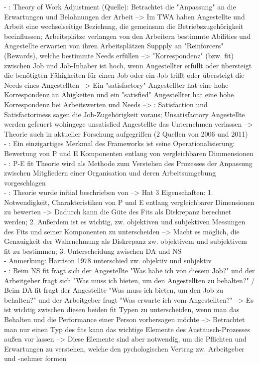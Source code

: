 - \cite[S. 3]{su:2015}: Theory of Work Adjustment (Quelle): Betrachtet die "Anpassung" an die Erwartungen und Belohnungen der Arbeit --> Im TWA haben Angestellte und Arbeit eine wechselseitige Beziehung, die gemeinsam die Betriebszugehörigkeit beeinflussen; Arbeitsplätze verlangen von den Arbeitern bestimmte Abilities und Angestellte erwarten von ihren Arbeitsplätzen Suppply an "Reinforcers" (Rewards), welche bestimmte Needs erfüllen --> "Korrespondenz" (bzw. fit) zwischen Job und Job-Inhaber ist hoch, wenn Angestellter erfüllt oder übersteigt die benötigten Fähigkeiten für einen Job oder ein Job trifft oder übersteigt die Needs eines Angestellten --> Ein "satisfactory" Angestellter hat eine hohe Korrespondenz an Ähigkeiten und ein "satisfied" Angestellter hat eine hohe Korrespondenz bei Arbeitswerten und Needs --> \cite[S. 4]{su:2015}: Satisfaction und Satisfactoriness sagen die Job-Zugehörigkeit voraus; Unsatisfactory Angestellte werden gefeuert wohingege unsatisfied Angestellte das Unternehmen verlassen --> Theorie auch in aktueller Forschung aufgegriffen (2 Quellen von 2006 und 2011) \\
- \cite[S. 1]{caplan:1987}: Ein einzigartiges Merkmal des Frameworks ist seine Operationalisierung: Bewertung von P und E  Komponenten entlang von vergleichbaren Dimmensionen \\
- \cite[S. 2]{caplan:1987}: P-E fit Theorie wird als Methode zum Verstehen des Prozesses der Anpassung zwischen Mitgliedern einer Organisation und deren Arbeitsumgebung vorgeschlagen \\
- \cite[S. 2]{caplan:1987}: Theorie wurde initial beschrieben von \textcite{copingAndAdaption:1974} --> Hat 3 Eigenschaften: 1. Notwendigkeit, Charakteristiken von P und E entlang vergleichbarer Dimensionen zu bewerten --> Dadurch kann die Güte des Fits als Diskrepanz berechnet werden; 2. Außerdem ist es wichtig, zw. objektiven und subjektiven Messungen des Fits und seiner Komponenten zu unterscheiden --> Macht es möglich, die Genauigkeit der Wahrnehmung als Diskrepanz zw. objektivem und subjektivem fit zu bestimmen; 3. Unterscheidung zwischen DA und NS \\
- Anmerkung: Harrison 1978 unterschied zw. objektiv und subjektiv \\
- \cite[S. 3]{caplan:1987}: Beim NS fit fragt sich der Angestellte "Was habe ich von diesem Job?" und der Arbeitgeber fragt sich "Was muss ich bieten, um den Angestellten zu behalten?" / Beim DA fit fragt der Angestellte "Was muss ich bieten, um den Job zu behalten?" und der Arbeitgeber fragt "Was erwarte ich vom Angestellten?" --> Es ist wichtig zwischen diesen beiden fit Typen zu unterscheiden, wenn man das Behalten und die Performance einer Person vorhersagen möchte --> Betrachtet man nur einen Typ des fits kann das wichtige Elemente des Austausch-Prozesses außen vor lassen --> Diese Elemente sind aber notwendig, um die Pflichten und Erwartungen zu verstehen, welche den pychologischen Vertrag zw. Arbeitgeber und -nehmer formen \\
